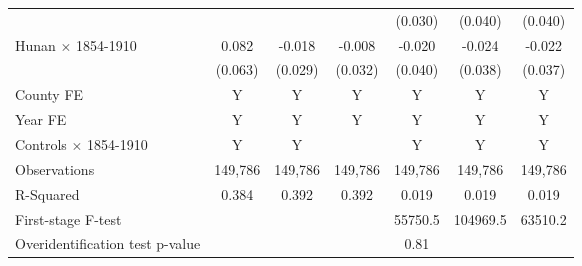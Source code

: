 {\begin{tabular}{l*{6}{c}}
                    &               &               &               &     (0.030)   &     (0.040)   &     (0.040)   \\
Hunan $ \times $ 1854-1910&       0.082   &      -0.018   &      -0.008   &      -0.020   &      -0.024   &      -0.022   \\
                    &     (0.063)   &     (0.029)   &     (0.032)   &     (0.040)   &     (0.038)   &     (0.037)   \\
\hline
County FE      & Y & Y & Y & Y & Y & Y \\ 
Year FE        & Y & Y & Y & Y & Y & Y \\ 
Controls $ \times $ 1854-1910  & Y & Y &  & Y & Y & Y \\ 
Observations        &     149,786   &     149,786   &     149,786   &     149,786   &     149,786   &     149,786   \\
R-Squared           &       0.384   &       0.392   &       0.392   &       0.019   &       0.019   &       0.019   \\
First-stage F-test  &               &               &               &     55750.5   &    104969.5   &     63510.2   \\
Overidentification test p-value&               &               &               &        0.81   &               &               \\
\hline\hline
\end{tabular}}
